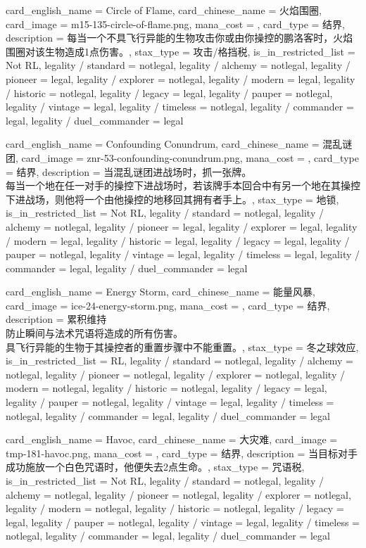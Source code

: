 \documentclass[lang = cn, color = black, 10pt]{AllThatStax}
\begin{document}
\card
{
	card_english_name = {Circle of Flame},
	card_chinese_name = {火焰围圈},
	card_image = m15-135-circle-of-flame.png,
	mana_cost = ,
	card_type = 结界,
	description = {每当一个不具飞行异能的生物攻击你或由你操控的鹏洛客时，火焰围圈对该生物造成1点伤害。},
	stax_type = 攻击/格挡税,
	is_in_restricted_list = Not RL,
	legality / standard = notlegal,
	legality / alchemy = notlegal,
	legality / pioneer = legal,
	legality / explorer = notlegal,
	legality / modern = legal,
	legality / historic = notlegal,
	legality / legacy = legal,
	legality / pauper = notlegal,
	legality / vintage = legal,
	legality / timeless = notlegal,
	legality / commander = legal,
	legality / duel_commander = legal
}

\card
{
	card_english_name = {Confounding Conundrum},
	card_chinese_name = {混乱谜团},
	card_image = znr-53-confounding-conundrum.png,
	mana_cost = ,
	card_type = 结界,
	description = {当混乱谜团进战场时，抓一张牌。\\
每当一个地在任一对手的操控下进战场时，若该牌手本回合中有另一个地在其操控下进战场，则他将一个由他操控的地移回其拥有者手上。},
	stax_type = 地锁,
	is_in_restricted_list = Not RL,
	legality / standard = notlegal,
	legality / alchemy = notlegal,
	legality / pioneer = legal,
	legality / explorer = legal,
	legality / modern = legal,
	legality / historic = legal,
	legality / legacy = legal,
	legality / pauper = notlegal,
	legality / vintage = legal,
	legality / timeless = legal,
	legality / commander = legal,
	legality / duel_commander = legal
}

\card
{
	card_english_name = {Energy Storm},
	card_chinese_name = {能量风暴},
	card_image = ice-24-energy-storm.png,
	mana_cost = ,
	card_type = 结界,
	description = {累积维持\\
防止瞬间与法术咒语将造成的所有伤害。\\
具飞行异能的生物于其操控者的重置步骤中不能重置。},
	stax_type = 冬之球效应,
	is_in_restricted_list = RL,
	legality / standard = notlegal,
	legality / alchemy = notlegal,
	legality / pioneer = notlegal,
	legality / explorer = notlegal,
	legality / modern = notlegal,
	legality / historic = notlegal,
	legality / legacy = legal,
	legality / pauper = notlegal,
	legality / vintage = legal,
	legality / timeless = notlegal,
	legality / commander = legal,
	legality / duel_commander = legal
}

\card
{
	card_english_name = {Havoc},
	card_chinese_name = {大灾难},
	card_image = tmp-181-havoc.png,
	mana_cost = ,
	card_type = 结界,
	description = {当目标对手成功施放一个白色咒语时，他便失去2点生命。},
	stax_type = 咒语税,
	is_in_restricted_list = Not RL,
	legality / standard = notlegal,
	legality / alchemy = notlegal,
	legality / pioneer = notlegal,
	legality / explorer = notlegal,
	legality / modern = notlegal,
	legality / historic = notlegal,
	legality / legacy = legal,
	legality / pauper = notlegal,
	legality / vintage = legal,
	legality / timeless = notlegal,
	legality / commander = legal,
	legality / duel_commander = legal
}
\end{document}
